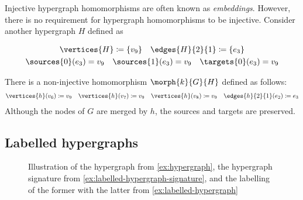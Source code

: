 \begin{example}
\begin{center}
\begin{minipage}{0.2\textwidth}
            \vspace{1.5em}

        \end{minipage}
    \end{center}

    Injective hypergraph homomorphisms are often known as \emph{embeddings}.
    However, there is no requirement for hypergraph homomorphisms to be
    injective.
    Consider another hypergraph \(H\) defined as
    \begin{center}
        \begin{minipage}{0.75\textwidth}
            \begin{gather*}
                \vertices{H} \coloneqq \{v_9\}
                \quad
                \edges{H}{2}{1} \coloneqq \{e_3\}
                \\
                \sources{0}(e_3) = v_9
                \quad
                \sources{1}(e_3) = v_9
                \quad
                \targets{0}(e_3) = v_9
            \end{gather*}
        \end{minipage}
        \begin{minipage}{0.2\textwidth}
            \centering

            \vspace{1.5em}

        \end{minipage}
    \end{center}
    There is a non-injective homomorphism \(\morph{k}{G}{H}\) defined as
    follows:
    \begin{gather*}
        \vertices{h}(v_6) \coloneqq v_9
        \quad
        \vertices{h}(v_7) \coloneqq v_9
        \quad
        \vertices{h}(v_8) \coloneqq v_9
        \quad
        \edges{h}{2}{1}(e_2) \coloneqq e_3
    \end{gather*}
    Although the nodes of \(G\) are merged by \(h\), the sources and
    targets are preserved.
\end{example}

\subsection{Labelled hypergraphs}

\begin{figure}
    \centering
    \qquad
    \qquad
    \caption{Illustration of the hypergraph from \cref{ex:hypergraph}, the
        hypergraph signature from \cref{ex:labelled-hypergraph-signature}, and the
        labelling of the former with the latter from
        \cref{ex:labelled-hypergraph}
    }
    \label{fig:hypergraph-ex}
\end{figure}


